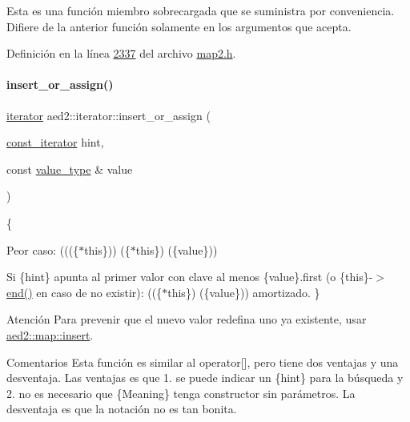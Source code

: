 Esta es una función miembro sobrecargada que se suministra por conveniencia. Difiere de la anterior función solamente en los argumentos que acepta. 

Definición en la línea \hyperlink{map2_8h_source_l02337}{2337} del archivo \hyperlink{map2_8h_source}{map2.\+h}.

\mbox{\label{classaed2_1_1iterator_aab34e7001b3ee3ce79da8ea24d7e6351_aab34e7001b3ee3ce79da8ea24d7e6351}} 
\paragraph{\texorpdfstring{insert\+\_\+or\+\_\+assign()}{insert\_or\_assign()}\hspace{0.1cm}{\footnotesize\ttfamily [1/2]}}
{\footnotesize\ttfamily \hyperlink{classaed2_1_1iterator_1_1iterator}{iterator} aed2\+::iterator\+::insert\+\_\+or\+\_\+assign (\begin{DoxyParamCaption}\item[{\hyperlink{classaed2_1_1iterator_1_1const__iterator}{const\+\_\+iterator}}]{hint,  }\item[{const \hyperlink{classaed2_1_1iterator_a6411a2c08b2b7c52f063bef1a168acb6_a6411a2c08b2b7c52f063bef1a168acb6}{value\+\_\+type} \&}]{value }\end{DoxyParamCaption})\hspace{0.3cm}{\ttfamily [inline]}}

\{
\begin{DoxyItemize}
\item Peor caso\+: (((\{$\ast$this\}))  (\{$\ast$this\})  (\{value\}))
\item Si \{hint\} apunta al primer valor con clave al menos \{value\}.first (o \{this\}-\/$>$\hyperlink{classaed2_1_1iterator_a67caf9468be999e9be96b7add5d79946_a67caf9468be999e9be96b7add5d79946}{end()} en caso de no existir)\+: ((\{$\ast$this\})  (\{value\})) amortizado. \}
\end{DoxyItemize}

\begin{DoxyAttention}{Atención}
Para prevenir que el nuevo valor redefina uno ya existente, usar \hyperlink{classaed2_1_1map_a60aacba06b1579630b3c8e996cf248c8_a60aacba06b1579630b3c8e996cf248c8}{aed2\+::map\+::insert}. 
\end{DoxyAttention}
\begin{DoxyRemark}{Comentarios}
Esta función es similar al operator\mbox{[}\mbox{]}, pero tiene dos ventajas y una desventaja. Las ventajas es que 1. se puede indicar un \{hint\} para la búsqueda y 2. no es necesario que \{Meaning\} tenga constructor sin parámetros. La desventaja es que la notación no es tan bonita. 
\end{DoxyRemark}


